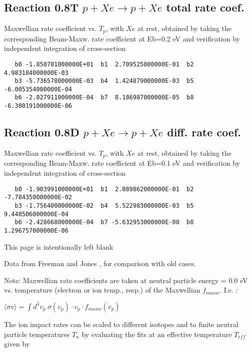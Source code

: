 \documentclass[12pt,dvipdfmx]{article}
\begin{document}
\subsection{
Reaction 0.8T  $p + Xe \rightarrow p + Xe$ total rate coef.
}
Maxwellian rate coefficient vs. $T_{p}$, with $Xe$ at rest, obtained by taking
the corresponding Beam-Maxw. rate coefficient at Eb=0.2 eV and
verification by independent integration of cross-section
\begin{small}\begin{verbatim}
   b0 -1.850781000000E+01  b1  2.709525000000E-01  b2  4.983184000000E-03
   b3 -5.736578000000E-03  b4  1.424879000000E-03  b5 -6.005354000000E-04
   b6 -2.027911000000E-04  b7  8.186987000000E-05  b8 -6.300191000000E-06
\end{verbatim}\end{small}


\subsection{
Reaction 0.8D  $p + Xe \rightarrow p + Xe$ diff. rate coef.
}
Maxwellian rate coefficient vs. $T_{p}$, with $Xe$ at rest, obtained by taking
the corresponding Beam-Maxw. rate coefficient at Eb=0.1 eV and
verification by independent integration of cross-section
\begin{small}\begin{verbatim}
   b0 -1.903991000000E+01  b1  2.089862000000E-01  b2 -7.784350000000E-02
   b3 -1.756400000000E-02  b4  5.522983000000E-03  b5  9.448506000000E-04
   b6 -2.428668000000E-04  b7 -5.632953000000E-08  b8  1.296757000000E-06
\end{verbatim}\end{small}



\newpage
This page is intentionally left blank
\newpage


Data from Freeman and Jones \cite{kn:Freeman},
for comparison with old cases.

Note: Maxwellian rate coefficients are taken at neutral particle energy = 0.0 eV
vs. temperature (electron or ion temp., resp.) of the Maxwellian $f_{maxw}$.
I.e. :

$\langle\sigma v \rangle = \int d^3v_p \ \sigma(v_{p}) \cdot v_{p} \cdot
f_{maxw}(v_{p})$

The ion impact rates can be scaled to different isotopes and to finite
neutral particle temperatures $T_n$ by evaluating the fits at an
effective temperature $T_{eff}$ given by
\end{document}
